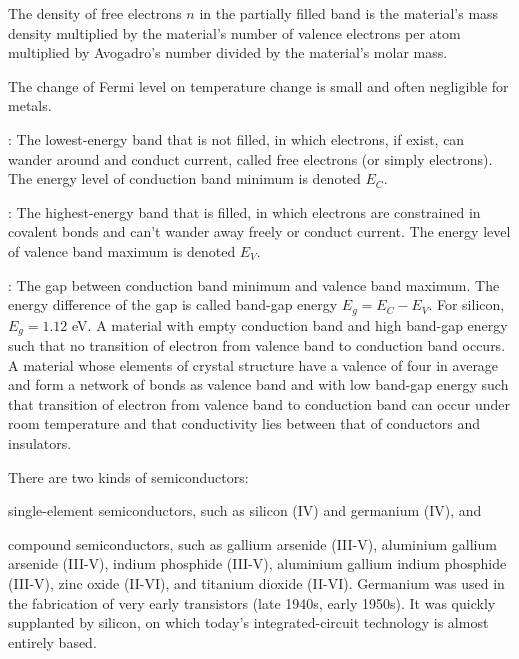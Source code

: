 \documentclass[a4paper,12pt]{report}
\begin{document}
The density of free electrons $n$ in the partially filled band is the material's mass density multiplied by the material's number of valence electrons per atom multiplied by Avogadro's number divided by the material's molar mass.

The change of Fermi level on temperature change is small and often negligible for metals.
\bit
\item{}: The lowest-energy band that is not filled, in which electrons, if exist, can wander around and conduct current, called free electrons (or simply electrons). The energy level of conduction band minimum is denoted $E_C$.
\item{}: The highest-energy band that is filled, in which electrons are constrained in covalent bonds and can't wander away freely or conduct current. The energy level of valence band maximum is denoted $E_V$.
\item{}: The gap between conduction band minimum and valence band maximum. The energy difference of the gap is called band-gap energy $E_g=E_C-E_V$. For silicon, $E_g=1.12$ eV.
\eit
{}
A material with empty conduction band and high band-gap energy such that no transition of electron from valence band to conduction band occurs.
A material whose elements of crystal structure have a valence of four in average and form a network of bonds as valence band and with low band-gap energy such that transition of electron from valence band to conduction band can occur under room temperature and that conductivity lies between that of conductors and insulators.

There are two kinds of semiconductors:
\bit
\item single-element semiconductors, such as silicon (IV) and germanium (IV), and
\item compound semiconductors, such as gallium arsenide  (III-V), aluminium gallium arsenide  (III-V), indium phosphide  (III-V), aluminium gallium indium phosphide  (III-V), zinc oxide  (II-VI), and titanium dioxide  (II-VI).
\eit
Germanium was used in the fabrication of very early transistors (late 1940s, early 1950s). It was quickly supplanted by silicon, on which today’s integrated-circuit technology is almost entirely based.
\end{document}
